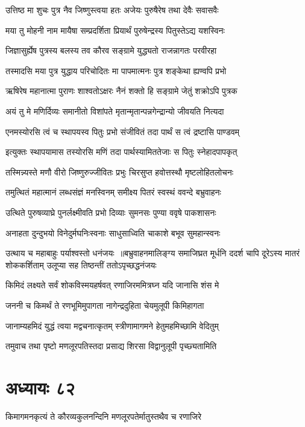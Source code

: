 \twolineshloka
{उत्तिष्ठ मा शुचः पुत्र नैव जिष्णुस्त्वया हतः}
{अजेयः पुरुषैरेष तथा देवैः सवासवैः}


\twolineshloka
{मया तु मोहनी नाम मायैषा सम्प्रदर्शिता}
{प्रियार्थं पुरुषेन्द्रस्य पितुस्तेऽद्य यशस्विनः}


\twolineshloka
{जिज्ञासुर्ह्येष पुत्रस्य बलस्य तव कौरव}
{सङ्ग्रामे युद्ध्यतो राजन्नागतः परवीरहा}


\twolineshloka
{तस्मादसि मया पुत्र युद्धाय परिचोदितः}
{मा पापमात्मनः पुत्र शङ्केथा ह्यण्वपि प्रभो}


\twolineshloka
{ऋषिरेष महानात्मा पुराणः शाश्वतोऽक्षरः}
{नैनं शक्तो हि सङ्ग्रामे जेतुं शक्रोऽपि पुत्रक}


\twolineshloka
{अयं तु मे मणिर्दिव्यः समानीतो विशांपते}
{मृतान्मृतान्पन्नगेन्द्रान्यो जीवयति नित्यदा}


\twolineshloka
{एनमस्योरसि त्वं च स्थापयस्व पितुः प्रभो}
{संजीवितं तदा पार्थं स त्वं द्रष्टासि पाण्डवम्}


\twolineshloka
{इत्युक्तः स्थापयामास तस्योरसि मणिं तदा}
{पार्थस्यामिततेजाः स पितुः स्नेहादपापकृत्}


\twolineshloka
{तस्मिन्न्यस्ते मणौ वीरो जिष्णुरुज्जीवितः प्रभुः}
{चिरसुप्त हवोत्तस्थौ मृष्टलोहितलोचनः}


\twolineshloka
{तमुत्थितं महात्मानं लब्धसंज्ञं मनस्विनम्}
{समीक्ष्य पितरं स्वस्थं ववन्दे बभ्रुवाहनः}


\twolineshloka
{उत्थिते पुरुषव्याघ्रे पुनर्लक्ष्मीवति प्रभो}
{दिव्याः सुमनसः पुण्या ववृषे पाकशासनः}


\twolineshloka
{अनाहता दुन्दुभयो विनेदुर्मघनिःस्वनाः}
{साधुसाध्विति चाकाशे बभूव सुमहान्स्वनः}


उत्थाय च महाबाहुः पर्याश्वस्तो धनंजयः ॥बभ्रुवाहनमालिङ्ग्य समाजिघ्रत मूर्धनि
\twolineshloka
{ददर्श चापि दूरेऽस्य मातरं शोककर्शिताम्}
{उलूप्या सह तिष्ठन्तीं ततोऽपृच्छद्धनंजयः}


\twolineshloka
{किमिदं लक्ष्यते सर्वं शोकविस्मयहर्षवत्}
{रणाजिरममित्रघ्न यदि जानासि शंस मे}


\twolineshloka
{जननी च किमर्थं ते रणभूमिमुपागता}
{नागेन्द्रदुहिता चेयमुलूपी किमिहागता}


\twolineshloka
{जानाम्यहमिदं युद्धं त्वया मद्वचनात्कृतम्}
{स्त्रीणामागमने हेतुमहमिच्छामि वेदितुम्}


\twolineshloka
{तमुवाच तथा पृष्टो मणलूरपतिस्तदा}
{प्रसाद्य शिरसा विद्वानुलूपी पृच्छ्यतामिति}


\chapter{अध्यायः ८२}
\twolineshloka
{किमागमनकृत्यं ते कौरव्यकुलनन्दिनि}
{मणलूरपतेर्मातुस्तथैव च रणाजिरे}


